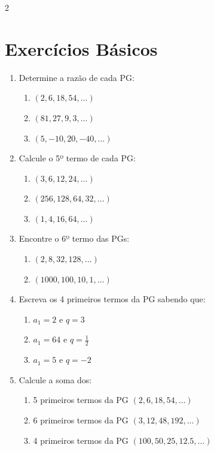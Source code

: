 \documentclass[11pt]{article}
\begin{document}
\begin{multicols}{2}

\section*{Exercícios Básicos}

\begin{enumerate}[leftmargin=*]

\item Determine a razão de cada PG:
\begin{enumerate}[label=\alph*)]
\item $(2, 6, 18, 54, \ldots)$
\item $(81, 27, 9, 3, \ldots)$
\item $(5, -10, 20, -40, \ldots)$
\end{enumerate}

\item Calcule o 5º termo de cada PG:
\begin{enumerate}[label=\alph*)]
\item $(3, 6, 12, 24, \ldots)$
\item $(256, 128, 64, 32, \ldots)$
\item $(1, 4, 16, 64, \ldots)$
\end{enumerate}

\item Encontre o 6º termo das PGs:
\begin{enumerate}[label=\alph*)]
\item $(2, 8, 32, 128, \ldots)$
\item $(1000, 100, 10, 1, \ldots)$
\end{enumerate}

\item Escreva os 4 primeiros termos da PG sabendo que:
\begin{enumerate}[label=\alph*)]
\item $a_1 = 2$ e $q = 3$
\item $a_1 = 64$ e $q = \frac{1}{2}$
\item $a_1 = 5$ e $q = -2$
\end{enumerate}

\item Calcule a soma dos:
\begin{enumerate}[label=\alph*)]
\item 5 primeiros termos da PG $(2, 6, 18, 54, \ldots)$
\item 6 primeiros termos da PG $(3, 12, 48, 192, \ldots)$
\item 4 primeiros termos da PG $(100, 50, 25, 12.5, \ldots)$
\end{enumerate}


\end{enumerate}
\end{multicols}
\end{document}
